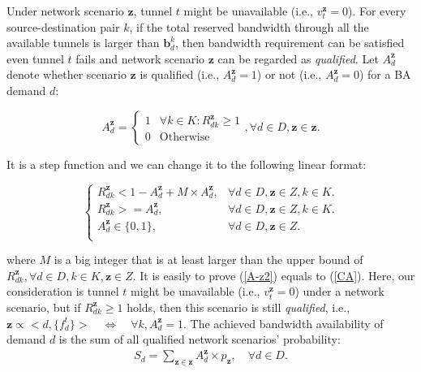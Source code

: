 \documentclass[sigconf]{acmart}
\begin{document}
\begin{appendices}
Under network scenario $\mathbf{z}$, tunnel $t$ might be unavailable (i.e., $v_t^{\mathbf{z}} =0$).
For every source-destination pair $k$, if the total reserved bandwidth through all the available tunnels is larger than $\mathbf{b}^k_d$,  then bandwidth requirement can be satisfied even tunnel $t$ fails and network scenario $\mathbf{z}$ can be regarded as \textit{qualified}.
Let $A_d^{\mathbf{z}}$ denote whether scenario $\mathbf{z}$ is qualified (i.e., $A_d^{\mathbf{z}}=1$) or not (i.e., $A_d^{\mathbf{z}}=0$) for a BA demand $d$:

\begin{equation}
A_d^{\mathbf{z}}=
\begin{cases}
1 &\text{$\forall k \in K:R_{dk}^{\mathbf{z}}\ge 1$}\\
0&\text{Otherwise}
\end{cases}
,\forall  d \in D, \mathbf{z}\in \mathbf{z}.
\label{CA}
\end{equation}



It is a step function and we can change it to the following linear format:
%
 


\begin{equation}
\begin{cases}
R_{dk}^{\mathbf{z}} < 1- A_d^{\mathbf{z}}+M\times A_d^{\mathbf{z}},&{\forall d \in D, \mathbf{z} \in Z, k\in K.} \\
R_{dk}^{\mathbf{z}}>=A_d^{\mathbf{z}},&{\forall d \in D, \mathbf{z} \in Z, k\in K.} \\
A_d^{\mathbf{z}} \in\{0,1\},&{\forall d \in D, \mathbf{z} \in Z.} \\
\end{cases}
\label{A-z2}
\end{equation}

where $M$ is a big integer that is at least larger than the upper bound of $R_{dk}^{\mathbf{z}},\forall d \in D, k\in K,\mathbf{z} \in Z$.
It is easily to  prove  (\ref{A-z2}) equals to  (\ref{CA}).
Here, our consideration is tunnel $t$ might be unavailable (i.e., $v_t^{\mathbf{z}} =0$) under a network scenario, but if $R_{dk}^{\mathbf{z}} \ge 1$ holds, then this scenario is still \textit{qualified}, i.e., 
$\mathbf{z} \propto <d, \{f_d^t\}> \quad \Leftrightarrow \quad \forall k, A_d^{\mathbf{z}}=1$. 
The achieved bandwidth availability of demand $d$ is the sum of all qualified network scenarios' probability: 
 \begin{eqnarray} \label{S}
S_d=\sum_{\mathbf{z}\in \mathbf{z}}A_d^{\mathbf{z}}\times p_{\mathbf{z}},  \quad \forall  d \in D.
\end{eqnarray}


\end{appendices}
\end{document}
